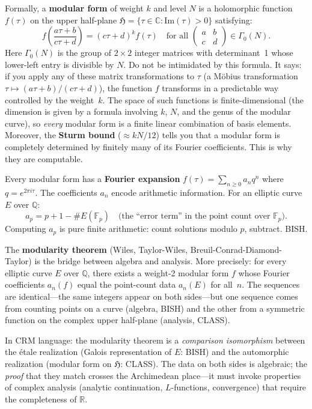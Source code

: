 \documentclass[11pt,twoside,openany]{report}
\theoremstyle{remark}
\newcommand{\BISH}{\textsf{BISH}}
\newcommand{\CLASS}{\textsf{CLASS}}
\begin{document}
Formally, a \textbf{modular form} of weight $k$ and level $N$ is a holomorphic function $f(\tau)$ on the upper half-plane $\mathfrak{H} = \{\tau \in \mathbb{C} : \mathrm{Im}(\tau) > 0\}$ satisfying:
\[
  f\!\left(\frac{a\tau + b}{c\tau + d}\right) = (c\tau + d)^k f(\tau)
  \quad \text{for all } \begin{pmatrix} a & b \\ c & d \end{pmatrix} \in \Gamma_0(N).
\]
Here $\Gamma_0(N)$ is the group of $2 \times 2$ integer matrices with determinant~1 whose lower-left entry is divisible by $N$. Do not be intimidated by this formula. It says: if you apply any of these matrix transformations to $\tau$ (a M\"obius transformation $\tau \mapsto (a\tau+b)/(c\tau+d)$), the function $f$ transforms in a predictable way controlled by the weight~$k$. The space of such functions is finite-dimensional (the dimension is given by a formula involving $k$, $N$, and the genus of the modular curve), so \emph{every} modular form is a finite linear combination of basis elements. Moreover, the \textbf{Sturm bound} ($\approx kN/12$) tells you that a modular form is completely determined by finitely many of its Fourier coefficients. This is why they are computable.

Every modular form has a \textbf{Fourier expansion} $f(\tau) = \sum_{n \geq 0} a_n q^n$ where $q = e^{2\pi i \tau}$. The coefficients $a_n$ encode arithmetic information. For an elliptic curve $E$ over $\mathbb{Q}$:
\[
  a_p = p + 1 - \#E(\mathbb{F}_p) \quad\text{(the ``error term'' in the point count over $\mathbb{F}_p$).}
\]
Computing $a_p$ is pure finite arithmetic: count solutions modulo $p$, subtract. \BISH.

The \textbf{modularity theorem} (Wiles, Taylor-Wiles, Breuil-Conrad-Diamond-Taylor) is the bridge between algebra and analysis. More precisely: for every elliptic curve $E$ over $\mathbb{Q}$, there exists a weight-2 modular form $f$ whose Fourier coefficients $a_n(f)$ equal the point-count data $a_n(E)$ for all~$n$. The sequences are identical---the same integers appear on both sides---but one sequence comes from counting points on a curve (algebra, \BISH) and the other from a symmetric function on the complex upper half-plane (analysis, \CLASS).

In CRM language: the modularity theorem is a \emph{comparison isomorphism} between the \'etale realization (Galois representation of $E$: \BISH) and the automorphic realization (modular form on $\mathfrak{H}$: \CLASS). The data on both sides is algebraic; the \emph{proof} that they match crosses the Archimedean place---it must invoke properties of complex analysis (analytic continuation, $L$-functions, convergence) that require the completeness of $\mathbb{R}$.
\end{document}
